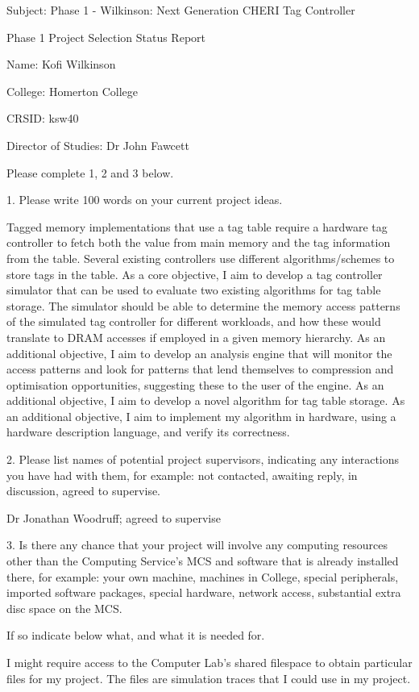 \documentclass[10pt,a4paper]{article}
\begin{document}
Subject: Phase 1 - Wilkinson: Next Generation CHERI Tag Controller

Phase 1 Project Selection Status Report

Name: Kofi Wilkinson

College: Homerton College

CRSID: ksw40

Director of Studies: Dr John Fawcett

Please complete 1, 2 and 3 below.

1. Please write 100 words on your current project ideas.

Tagged memory implementations that use a tag table require a hardware tag controller to fetch both the value from main memory and the tag information from the table. Several existing controllers use different algorithms/schemes to store tags in the table.
As a core objective, I aim to develop a tag controller simulator that can be used to evaluate two existing algorithms for tag table storage. The simulator should be able to determine the memory access patterns of the simulated tag controller for different workloads, and how these would translate to DRAM accesses if employed in a given memory hierarchy.
As an additional objective, I aim to develop an analysis engine that will monitor the access patterns and look for patterns that lend themselves to compression and optimisation opportunities, suggesting these to the user of the engine.
As an additional objective, I aim to develop a novel algorithm for tag table storage.
As an additional objective, I aim to implement my algorithm in hardware, using a hardware description language, and verify its correctness.


2. Please list names of potential project supervisors, indicating
any interactions you have had with them, for example: not
contacted, awaiting reply, in discussion, agreed to supervise.

Dr Jonathan Woodruff; agreed to supervise


3. Is there any chance that your project will involve any
computing resources other than the Computing Service's MCS and
software that is already installed there, for example: your own
machine, machines in College, special peripherals, imported
software packages, special hardware, network access, substantial
extra disc space on the MCS.

If so indicate below what, and what it is needed for.

I might require access to the Computer Lab's shared filespace to obtain particular files for my project. The files are simulation traces that I could use in my project.
\end{document}
